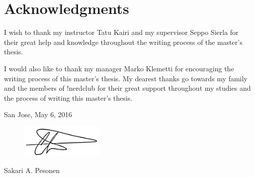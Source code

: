 \documentclass[12pt,a4paper,oneside,pdftex]{report}
\newcommand{\DATE}{May 6, 2016}
\newcommand{\AUTHOR}{Sakari A. Pesonen}
\begin{document}



\chapter*{Acknowledgments}

I wish to thank my instructor Tatu Kairi and my supervisor Seppo Sierla for their great help and knowledge throughout the writing process of the master's thesis.

I would also like to thank my manager Marko Klemetti for encouraging the writing process of this master's thesis. My dearest thanks go towards my family and the members of !nerdclub for their great support throughout my studies and the process of writing this master's thesis.

\vskip 10mm

\noindent San Jose, \DATE
\begin{figure}[ht]
    \includegraphics[width=4cm]{images/signature.png}
    \label{fig:signature}
\end{figure}
\vskip -5mm
\noindent\AUTHOR


\cleardoublepage


\cleardoublepage
\tableofcontents
\end{document}
